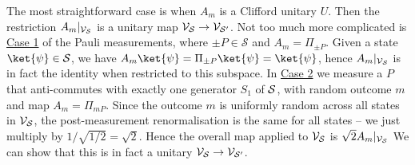 The most straightforward case is when $A_m$ is a Clifford unitary $U$.
Then the restriction $A_m|_{\mathcal{V}_{\mathcal{S}}}$ is a unitary map $\mathcal{V}_{\mathcal{S}} \to \mathcal{V}_{\mathcal{S}'}$.
Not too much more complicated is \hyperref[thm:stabilizer_group_update_measurement:case1]{Case 1} of the Pauli measurements, where $\pm P \in \mathcal{S}$ and $A_m = \Pi_{\pm P}$.
Given a state $\ket{\psi} \in \SSS$, we have $A_m \ket{\psi} = \Pi_{\pm P} \ket{\psi} = \ket{\psi}$, hence $A_m|_{\mathcal{V}_{\mathcal{S}}}$ is in fact the identity when restricted to this subspace.
In \hyperref[thm:stabilizer_group_update_measurement:case2]{Case 2} we measure a $P$ that anti-commutes with exactly one generator $S_1$ of $\mathcal{S}$, with random outcome $m$ and map $A_m = \Pi_{mP}$.
Since the outcome $m$ is uniformly random across all states in $\mathcal{V}_{\mathcal{S}}$, the post-measurement renormalisation is the same for all states -- we just multiply by $1/{\sqrt{1/2}} = \sqrt{2}$.
Hence the overall map applied to $\mathcal{V}_{\mathcal{S}}$ is $\sqrt{2} A_m|_{\mathcal{V}_{\mathcal{S}}}$
We can show that this is in fact a unitary $\mathcal{V}_{\mathcal{S}} \to \mathcal{V}_{\mathcal{S}'}$.

